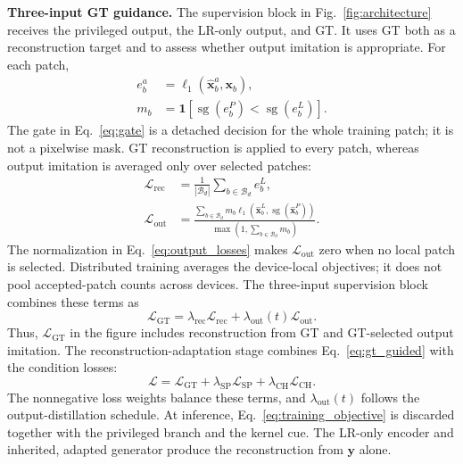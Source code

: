 \documentclass[10pt,journal,letterpaper]{IEEEtran}
\begin{document}
\noindent\textbf{Three-input GT guidance.}
The supervision block in Fig.~\ref{fig:architecture} receives the privileged output, the LR-only output, and GT. It uses GT both as a reconstruction target and to assess whether output imitation is appropriate. For each patch,
\begin{equation}
\begin{aligned}
e_b^a&=\ell_1(\widehat{\mathbf x}_b^a,\mathbf x_b),\\
m_b&=\mathbf 1\!\left[\operatorname{sg}(e_b^P)<\operatorname{sg}(e_b^L)\right].
\end{aligned}
\label{eq:gate}
\end{equation}
The gate in Eq.~\eqref{eq:gate} is a detached decision for the whole training patch; it is not a pixelwise mask. GT reconstruction is applied to every patch, whereas output imitation is averaged only over selected patches:
\begin{equation}
\begin{aligned}
\mathcal L_{\mathrm{rec}}&=\frac{1}{|\mathcal B_d|}\sum_{b\in\mathcal B_d}e_b^L,\\
\mathcal L_{\mathrm{out}}&=
\frac{\sum_{b\in\mathcal B_d}m_b\ell_1(\widehat{\mathbf x}_b^L,\operatorname{sg}(\widehat{\mathbf x}_b^P))}
{\max(1,\sum_{b\in\mathcal B_d}m_b)}.
\end{aligned}
\label{eq:output_losses}
\end{equation}
The normalization in Eq.~\eqref{eq:output_losses} makes $\mathcal L_{\mathrm{out}}$ zero when no local patch is selected. Distributed training averages the device-local objectives; it does not pool accepted-patch counts across devices. The three-input supervision block combines these terms as
\begin{equation}
\mathcal L_{\mathrm{GT}}
=\lambda_{\mathrm{rec}}\mathcal L_{\mathrm{rec}}
+\lambda_{\mathrm{out}}(t)\mathcal L_{\mathrm{out}}.
\label{eq:gt_guided}
\end{equation}
Thus, $\mathcal L_{\mathrm{GT}}$ in the figure includes reconstruction from GT and GT-selected output imitation. The reconstruction-adaptation stage combines Eq.~\eqref{eq:gt_guided} with the condition losses:
\begin{equation}
\mathcal L
=\mathcal L_{\mathrm{GT}}
+\lambda_{\mathrm{SP}}\mathcal L_{\mathrm{SP}}
+\lambda_{\mathrm{CH}}\mathcal L_{\mathrm{CH}}.
\label{eq:training_objective}
\end{equation}
The nonnegative loss weights balance these terms, and $\lambda_{\mathrm{out}}(t)$ follows the output-distillation schedule. At inference, Eq.~\eqref{eq:training_objective} is discarded together with the privileged branch and the kernel cue. The LR-only encoder and inherited, adapted generator produce the reconstruction from $\mathbf y$ alone.
\end{document}
